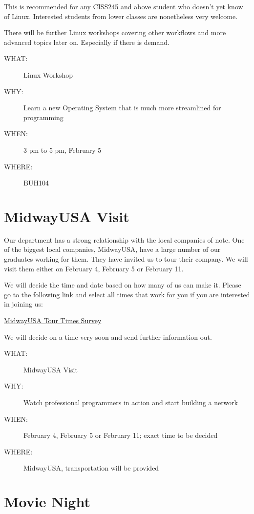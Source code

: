 This is recommended for any CISS245 and above student who doesn't yet know of
Linux. Interested students from lower classes are nonetheless very welcome.

There will be further Linux workshops covering other workflows and more advanced
topics later on. Especially if there is demand.

\begin{description}
\item[{WHAT:}] Linux Workshop
\item[{WHY:}] Learn a new Operating System that is much more streamlined for programming
\item[{WHEN:}] 3 pm to 5 pm, February 5
\item[{WHERE:}] BUH104
\end{description}


\newpage


\section{MidwayUSA Visit}
\label{sec-4}

Our department has a strong relationship with the local companies of note. One
of the biggest local companies, MidwayUSA, have a large number of our graduates
working for them. They have invited us to tour their company. We will visit
them either on February 4, February 5 or February 11. 

We will decide the time and date based on how many of us can make it. Please go
to the following link and select all times that work for you if you are
interested in joining us:

\href{http://bit.ly/1m8i0XL}{MidwayUSA Tour Times Survey}

We will decide on a time very soon and send further information out.

\begin{description}
\item[{WHAT:}] MidwayUSA Visit
\item[{WHY:}] Watch professional programmers in action and start building a network
\item[{WHEN:}] February 4, February 5 or February 11; exact time to be decided
\item[{WHERE:}] MidwayUSA, transportation will be provided
\end{description}


\newpage


\section{Movie Night}
\label{sec-5}

